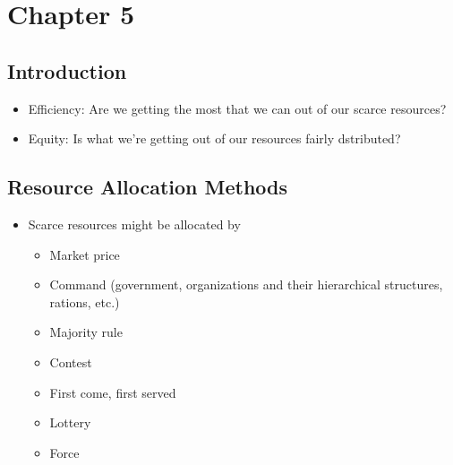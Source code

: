 \documentclass[11pt]{article}
\author{Sudhan Chitgopkar}
\date{\today}
\title{}
\begin{document}
\tableofcontents

\section{Chapter 5}
\label{sec:orgf876883}
\subsection{Introduction}
\label{sec:orgbeecfe5}
\begin{itemize}
\item Efficiency: Are we getting the most that we can out of our scarce resources?
\item Equity: Is what we're getting out of our resources fairly dstributed?
\end{itemize}
\subsection{Resource Allocation Methods}
\label{sec:org08c0535}
\begin{itemize}
\item Scarce resources might be allocated by
\begin{itemize}
\item Market price
\item Command (government, organizations and their hierarchical structures, rations, etc.)
\item Majority rule
\item Contest
\item First come, first served
\item Lottery
\item Force
\end{itemize}
\end{itemize}
\end{document}
